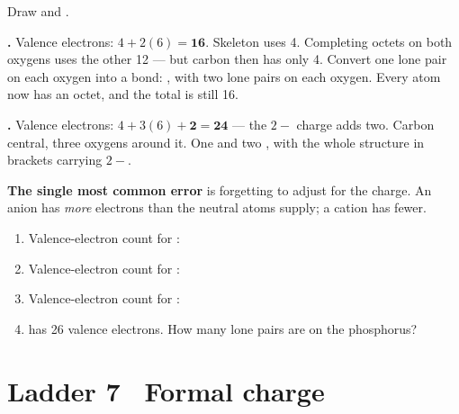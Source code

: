 \documentclass{apchem-worksheet}
\begin{document}
\begin{workedexample}
Draw  and .

\textbf{.} Valence electrons: $4 + 2(6) = \mathbf{16}$.
Skeleton  uses 4. Completing octets on both oxygens uses the
other 12 --- but carbon then has only 4. Convert one lone pair on each
oxygen into a bond: , with two lone pairs on each oxygen. Every
atom now has an octet, and the total is still 16. \checkmark

\textbf{.} Valence electrons:
$4 + 3(6) + \mathbf{2} = \mathbf{24}$ --- the $2-$ charge adds two.
Carbon central, three oxygens around it. One  and two ,
with the whole structure in brackets carrying $2-$.

\textbf{The single most common error} is forgetting to adjust for the
charge. An anion has \emph{more} electrons than the neutral atoms
supply; a cation has fewer.
\end{workedexample}

\begin{yourturn}
\begin{enumerate}[leftmargin=*,itemsep=0.5em]
  \item Valence-electron count for : \workspace[1.4cm]
  \item Valence-electron count for : \workspace[1.4cm]
  \item Valence-electron count for : \workspace[1.4cm]
  \item {} has 26 valence electrons. How many lone pairs are on the
        phosphorus? \workspace[1.8cm]
\end{enumerate}
\end{yourturn}

\section*{\sffamily Ladder 7 \textbullet\ Formal charge}
\end{document}
